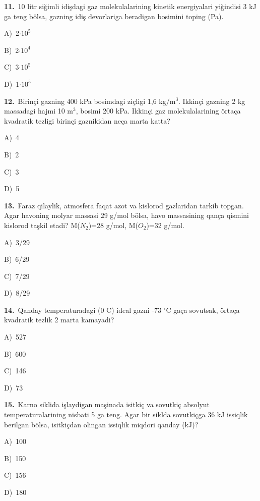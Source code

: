 \documentclass[11pt,a4paper]{article}
\newcommand{\opt}[2]{\hspace*{4mm}#1)\ #2\par}
\begin{document}
\noindent\begin{minipage}{\linewidth}
\textbf{11.}\ 10 litr siğimli idişdagi gaz molekulalarining kinetik energiyalari yiğindisi 3 kJ ga teng bölsa, gazning idiş devorlariga beradigan bosimini toping (Pa).\par\smallskip
\opt{A}{2$\cdot10^{5}$}
\opt{B}{2$\cdot10^{4}$}
\opt{C}{3$\cdot10^{5}$}
\opt{D}{1$\cdot10^{5}$}
\end{minipage}\vspace{9pt}\par
\noindent\begin{minipage}{\linewidth}
\textbf{12.}\ Birinçi gazning 400 kPa bosimdagi ziçligi 1,6 kg/m$^{3}$. Ikkinçi gazning 2 kg massadagi hajmi 10 m$^{3}$, bosimi 200 kPa. Ikkinçi gaz molekulalarining örtaça kvadratik tezligi birinçi gaznikidan neça marta katta?\par\smallskip
\opt{A}{4}
\opt{B}{2}
\opt{C}{3}
\opt{D}{5}
\end{minipage}\vspace{9pt}\par
\noindent\begin{minipage}{\linewidth}
\textbf{13.}\ Faraz qilaylik, atmosfera faqat azot va kislorod gazlaridan tarkib topgan. Agar havoning molyar massasi 29 g/mol bölsa, havo massasining qança qismini kislorod taşkil etadi? M($N_2$)=28 g/mol, M($O_2$)=32 g/mol.\par\smallskip
\opt{A}{3/29}
\opt{B}{6/29}
\opt{C}{7/29}
\opt{D}{8/29}
\end{minipage}\vspace{9pt}\par
\noindent\begin{minipage}{\linewidth}
\textbf{14.}\ Qanday temperaturadagi (0 C) ideal gazni -73 $^\circ$C gaça sovutsak, örtaça kvadratik tezlik 2 marta kamayadi?\par\smallskip
\opt{A}{527}
\opt{B}{600}
\opt{C}{146}
\opt{D}{73}
\end{minipage}\vspace{9pt}\par
\noindent\begin{minipage}{\linewidth}
\textbf{15.}\ Karno siklida işlaydigan maşinada isitkiç va sovutkiç absolyut temperaturalarining nisbati 5 ga teng. Agar bir siklda sovutkiçga 36 kJ issiqlik berilgan bölsa, isitkiçdan olingan issiqlik miqdori qanday (kJ)?\par\smallskip
\opt{A}{100}
\opt{B}{150}
\opt{C}{156}
\opt{D}{180}
\end{minipage}\vspace{9pt}\par
\end{document}
